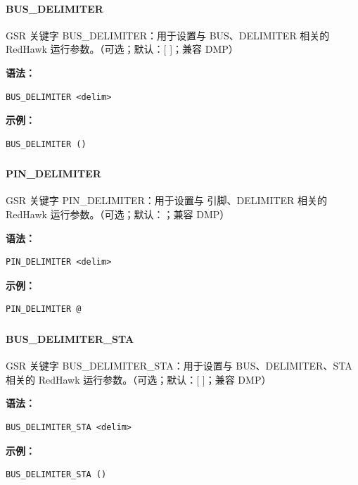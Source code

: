 \paragraph*{BUS_DELIMITER}

GSR 关键字 BUS_DELIMITER：用于设置与 BUS、DELIMITER 相关的 RedHawk 运行参数。（可选；默认：[ ]；兼容 DMP）

\textbf{语法：}
\begin{lstlisting}
BUS_DELIMITER <delim>
\end{lstlisting}

\textbf{示例：}
\begin{lstlisting}
BUS_DELIMITER ()
\end{lstlisting}

\subsubsection{}
\paragraph*{PIN_DELIMITER}

GSR 关键字 PIN_DELIMITER：用于设置与 引脚、DELIMITER 相关的 RedHawk 运行参数。（可选；默认：；兼容 DMP）

\textbf{语法：}
\begin{lstlisting}
PIN_DELIMITER <delim>
\end{lstlisting}

\textbf{示例：}
\begin{lstlisting}
PIN_DELIMITER @
\end{lstlisting}

\subsubsection{}
\paragraph*{BUS_DELIMITER_STA}

GSR 关键字 BUS_DELIMITER_STA：用于设置与 BUS、DELIMITER、STA 相关的 RedHawk 运行参数。（可选；默认：[ ]；兼容 DMP）

\textbf{语法：}
\begin{lstlisting}
BUS_DELIMITER_STA <delim>
\end{lstlisting}

\textbf{示例：}
\begin{lstlisting}
BUS_DELIMITER_STA ()
\end{lstlisting}

